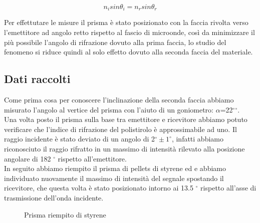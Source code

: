 \documentclass{article}
\theoremstyle{definition}
\begin{document}
\[n_{i} sin\theta_{i}=n_{r} sin\theta_{r}\]

Per effettutare le misure il prisma è stato posizionato con la faccia rivolta verso l'emettitore ad angolo retto rispetto al fascio di microonde, così da minimizzare il più possibile l'angolo di rifrazione dovuto alla prima faccia, lo studio del fenomeno si riduce quindi al solo effetto dovuto alla seconda faccia del materiale.
\begin{figure}[!ht]
    	\captionsetup{labelformat=empty}

\end{figure}

\subsection{Dati raccolti}
Come prima cosa per conoscere l'inclinazione della seconda faccia abbiamo misurato l'angolo al vertice del prisma con l'aiuto di un goniometro: \(\alpha\)=22\(^{\circ}\)\(^{\circ}\).\\
Una volta posto il prisma sulla base tra emettitore e ricevitore abbiamo potuto verificare che l'indice di rifrazione del polistirolo è approssimabile ad uno. Il raggio incidente è stato deviato di un angolo di 2\(^{\circ} \pm1 ^{\circ}\), infatti abbiamo riconosciuto il raggio rifratto in un massimo di intensità rilevato alla posizione angolare di 182 \(^{\circ}\) rispetto all'emettitore.\\
In seguito abbiamo riempito il prisma di pellets di styrene ed e abbiamo individuato nuovamente il massimo di intensità del segnale spostando il ricevitore, che questa volta è stato posizionato intorno ai 13.5 \(^{\circ}\) rispetto all'asse di trasmissione dell'onda incidente. 

\begin{figure}[!htbp]
    	\captionsetup{labelformat=empty}
        \caption{Prisma riempito di styrene}
    	
\end{figure}
\end{document}
